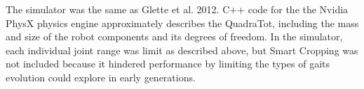 The simulator was the same as Glette et al. 2012\cite{glette}. C++ code for the the Nvidia PhysX physics engine approximately describes the QuadraTot, including the mass and size of the robot components and its degrees of freedom. In the simulator, each individual joint range was limit as described above, but Smart Cropping was not included because it hindered performance by limiting the types of gaits evolution could explore in early generations. 


